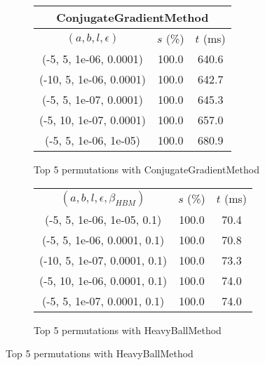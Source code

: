 \begin{figure}[H]
\begin{subfigure}[ht]{.5\textwidth}
\begin{tabular}{|c|c|c|}
\multicolumn{3}{|c|}{ConjugateGradientMethod} \\
\hline
\rowcolor{gray!25}
$(a,b,l,\epsilon)$ & $s$ (\%) & $t$ (ms) \\
\hline
(-5, 5, 1e-06, 0.0001) & 100.0 & 640.6 \\
(-10, 5, 1e-06, 0.0001) & 100.0 & 642.7 \\
(-5, 5, 1e-07, 0.0001) & 100.0 & 645.3 \\
(-5, 10, 1e-07, 0.0001) & 100.0 & 657.0 \\
(-5, 5, 1e-06, 1e-05) & 100.0 & 680.9 \\
\hline
\end{tabular}
\caption{Top 5 permutations with ConjugateGradientMethod}
\label{subfig:param_comp_NegativeEntropy_ConjugateGradientMethod_DichotomousSearch}
\end{subfigure}
\hfill
\begin{subfigure}[ht]{.5\textwidth}
\begin{tabular}{|c|c|c|}
\hline
\rowcolor{gray!25}
\multicolumn{3}{|c|}{HeavyBallMethod} \\
\hline
\rowcolor{gray!25}
$(a,b,l,\epsilon,\beta_{HBM})$ & $s$ (\%) & $t$ (ms) \\
\hline
(-5, 5, 1e-06, 1e-05, 0.1) & 100.0 & 70.4 \\
(-5, 5, 1e-06, 0.0001, 0.1) & 100.0 & 70.8 \\
(-10, 5, 1e-07, 0.0001, 0.1) & 100.0 & 73.3 \\
(-5, 10, 1e-06, 0.0001, 0.1) & 100.0 & 74.0 \\
(-5, 5, 1e-07, 0.0001, 0.1) & 100.0 & 74.0 \\
\hline
\end{tabular}
\caption{Top 5 permutations with HeavyBallMethod}
\label{subfig:param_comp_NegativeEntropy_HeavyBallMethod_DichotomousSearch}
\end{subfigure}
\end{figure}